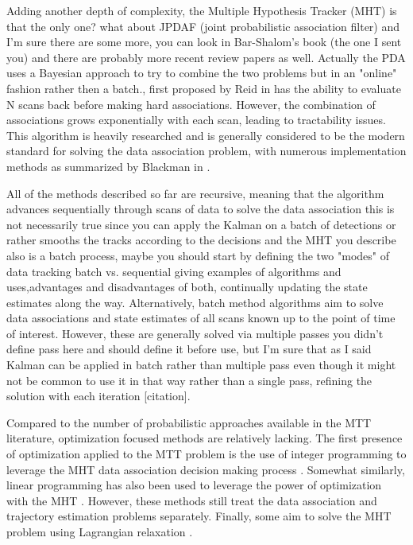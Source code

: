\documentclass[journal]{IEEEtran}
\begin{document}
Adding another depth of complexity, the Multiple Hypothesis Tracker (MHT) {\color{red} is that the only one? what about JPDAF (joint probabilistic association filter) and I'm sure there are some more, you can look in Bar-Shalom's book (the one I sent you) and there are probably more recent review papers as well. Actually the PDA uses a Bayesian approach to try to combine the two problems but in an "online" fashion rather then a batch.}, first proposed by Reid in  \cite{MHT-Seminal} has the ability to evaluate N scans back before making hard associations. However, the combination of associations grows exponentially with each scan, leading to tractability issues. This algorithm is heavily researched and is generally considered to be the modern standard for solving the data association problem, with numerous implementation methods as summarized by Blackman in \cite{MHT-Overview}.

All of the methods described so far are recursive, meaning that the algorithm advances sequentially through scans of data to solve the data association {\color{red} this is not necessarily true since you can apply the Kalman on a batch of detections or rather smooths the tracks according to the decisions and the MHT you describe also is a batch process, maybe you should start by defining the two "modes" of data tracking batch vs. sequential giving examples of algorithms and uses,advantages and disadvantages of both}, continually updating the state estimates along the way. Alternatively, batch method algorithms aim to solve data associations and state estimates of all scans known up to the point of time of interest. However, these are generally solved via multiple passes {\color{red} you didn't define pass here and should define it before use, but I'm sure that as I said Kalman can be applied in batch rather than multiple pass even though it might not be common to use it in that way} rather than a single pass, refining the solution with each iteration [citation].

Compared to the number of probabilistic approaches available in the MTT literature, optimization focused methods are relatively lacking. The first presence of optimization applied to the MTT problem is the use of integer programming to leverage the MHT data association decision making process \cite{MHT-IP}. Somewhat similarly, linear programming has also been used to leverage the power of optimization with the MHT \cite{MHT-LP}. However, these methods still treat the data association and trajectory estimation problems separately. Finally, some aim to solve the MHT problem using Lagrangian relaxation \cite{Lagrangian}.
\end{document}

